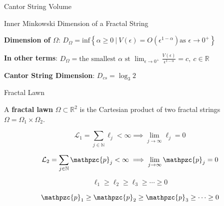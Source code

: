 \documentclass{if-beamer}
\newcommand{\R}{\mathbb{R}}
\newcommand{\N}{\mathbb{N}}
\newcommand{\SL}{\mathcal{L}}
\newcommand{\Om}{\Omega}
\newcommand{\p}{\mathpzc{p}}
\begin{document}
\begin{frame}{Cantor String Volume}
	\begin{center}
	\end{center}
\end{frame}



\begin{frame}{Inner Minkowski Dimension of a Fractal String}

\begin{definition}
{\bf Dimension of $\Om$}: $D_\Om =\text{inf}\left\{ \alpha \geq 0\ |\ V(\epsilon)=O\left(\epsilon^{1-\alpha}\right) \text{as  } \epsilon \rightarrow 0^{+}\right\}$
\end{definition}

\pause
\vspace{.2 in}

{\bf In other terms}: $D_\Om = \text{the smallest  }\alpha \text{ st } \displaystyle \lim_{\epsilon \to 0^{+}} \frac{V(\epsilon)}{\epsilon^{1-\alpha}}=c, \ c\in \mathbb{R}$

\pause
\vspace{.2 in}

{\bf Cantor String Dimension}: $D_{cs} = \log_3 2$

\end{frame}



\begin{frame}{Fractal Lawn}

	\begin{definition}
	A {\bf fractal lawn} $\Om \subset \R^2$ is the Cartesian product of two fractal strings $\Om=\Om_1\times\Om_2$.
	\end{definition}
	
	\pause
	\vspace{0.2 in}

	\[ \displaystyle \SL_1 = \sum_{j \in \N} \ell_j < \infty \implies \lim_{j \to \infty} \ell_j = 0 \]
	
	\[ \displaystyle \SL_2 = \sum_{j \in \N} \p_j < \infty \implies \lim_{j \to \infty} \p_j = 0 \]
	\pause
	
	\[ \ell_1 \geq \ell_2 \geq \ell_3 \geq \cdots \geq 0 \]
	
	\[ \p_1 \geq \p_2 \geq \p_3 \geq \cdots \geq 0 \]

\end{frame}
\end{document}
